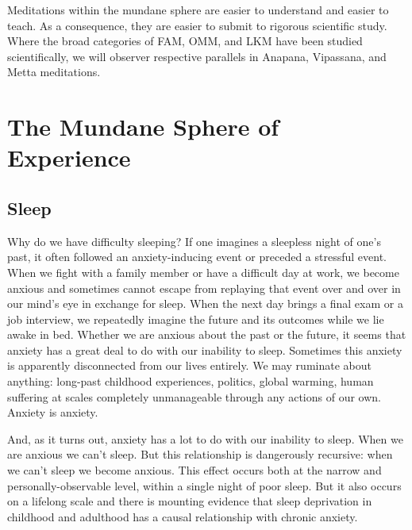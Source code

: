 \documentclass[a4paper, amsfonts, amssymb, amsmath, reprint, showkeys, nofootinbib, twoside]{revtex4-1}
\begin{document}
Meditations within the mundane sphere are easier to understand and easier to
teach. As a consequence, they are easier to submit to rigorous scientific
study. Where the broad categories of FAM, OMM, and LKM have been studied
scientifically, we will observer respective parallels in Anapana, Vipassana, and
Metta meditations.

\section{The Mundane Sphere of Experience}

\subsection{Sleep}

Why do we have difficulty sleeping? If one imagines a sleepless night of one's past,
it often followed an anxiety-inducing event or preceded a stressful event. When we
fight with a family member or have a difficult day at work, we become anxious and
sometimes cannot escape from replaying that event over and over in our mind's
eye in exchange for sleep. When the next day brings a final exam or a job interview,
we repeatedly imagine the future and its outcomes while we lie awake in bed. Whether
we are anxious about the past or the future, it seems that anxiety has a great deal
to do with our inability to sleep. Sometimes this anxiety is apparently disconnected
from our lives entirely. We may ruminate about anything: long-past childhood
experiences, politics, global warming, human suffering at scales completely
unmanageable through any actions of our own. Anxiety is anxiety.


And, as it turns out, anxiety has a lot to do with our inability to
sleep. When we are anxious we can't sleep. \cite{mellman2006, staner2003}
But this relationship is dangerously recursive: when we can't sleep we become
anxious. This effect occurs both at the narrow and personally-observable level, within a single
night of poor sleep. But it also occurs on a lifelong scale and there is mounting
evidence that sleep deprivation in childhood and adulthood has a causal relationship
with chronic anxiety. \cite{gregory2005, willis2015}
\end{document}
